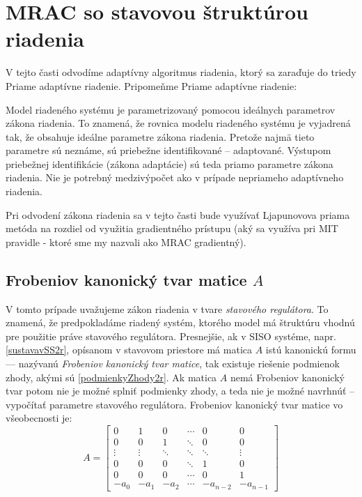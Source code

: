 \documentclass[a4paper, 10pt, ]{article}
\begin{document}
\section{MRAC so stavovou štruktúrou riadenia}


V tejto časti odvodíme adaptívny algoritmus riadenia, ktorý sa zaraďuje do triedy Priame adaptívne riadenie. Pripomeňme Priame adaptívne riadenie:

\noindent
Model riadeného systému je parametrizovaný pomocou ideálnych parametrov zákona riadenia. To znamená, že rovnica modelu riadeného systému je vyjadrená tak, že obsahuje ideálne parametre zákona riadenia. Pretože najmä tieto parametre sú neznáme, sú priebežne identifikované -- adaptované. Výstupom priebežnej identifikácie (zákona adaptácie) sú teda priamo parametre zákona riadenia. Nie je potrebný medzivýpočet ako v prípade nepriameho adaptívneho riadenia.

Pri odvodení zákona riadenia sa v tejto časti bude využívať Ljapunovova priama metóda na rozdiel od využitia gradientného prístupu (aký sa využíva pri MIT pravidle - ktoré sme my nazvali ako MRAC gradientný).


\subsection{Frobeniov kanonický tvar matice $A$}

V tomto prípade uvažujeme zákon riadenia v tvare \emph{stavového regulátora}. To znamená, že predpokladáme riadený systém, ktorého model má štruktúru vhodnú pre použitie práve stavového regulátora. Presnejšie, ak v SISO systéme, napr. \eqref{sustavavSS2r}, opísanom v stavovom priestore má matica $A$ istú kanonickú formu --- nazývanú \emph{Frobeniov kanonický tvar matice}, tak existuje riešenie podmienok zhody, akými sú \eqref{podmienkyZhody2r}. Ak matica $A$ nemá Frobeniov kanonický tvar potom nie je možné splniť podmienky zhody, a teda nie je možné navrhnúť -- vypočítať parametre stavového regulátora. Frobeniov kanonický tvar matice vo všeobecnosti je:
\begin{equation}
    A
    =
    \begin{bmatrix}
      0      & 1      & 0      & \cdots & 0      & 0      \\
       0      & 0      & 1      & \ddots & 0      & 0      \\
    \vdots & \vdots & \ddots & \ddots & \ddots & \vdots \\
    0      & 0      & 0      & \ddots & 1      & 0      \\
    0      & 0      & 0      & \cdots & 0      & 1      \\
       -a_0   & -a_1   & -a_2   & \cdots &-a_{n-2}&-a_{n-1}
    \end{bmatrix}
\end{equation}
\end{document}
